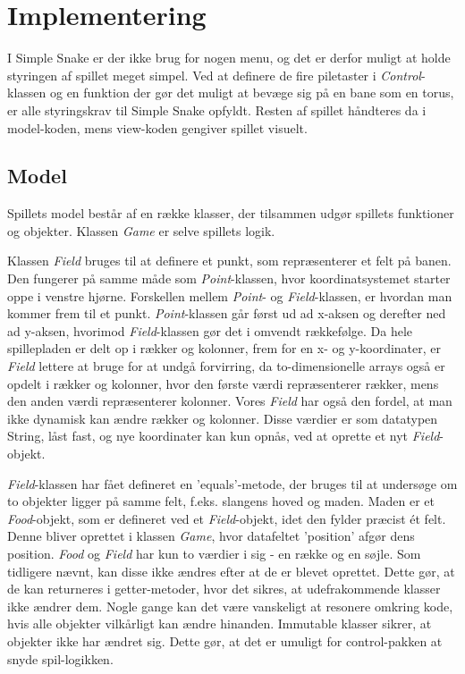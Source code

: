 \section{Implementering}
I Simple Snake er der ikke brug for nogen menu, og det er derfor muligt at holde styringen af spillet meget simpel. Ved at definere de fire piletaster i \textit{Control}-klassen og en funktion der gør det muligt at bevæge sig på en bane som en torus, er alle styringskrav til Simple Snake opfyldt. Resten af spillet håndteres da i model-koden, mens view-koden gengiver spillet visuelt.
\newline

\subsection{Model}
Spillets model består af en række klasser, der tilsammen udgør spillets funktioner og objekter. Klassen \textit{Game} er selve spillets logik.

Klassen \textit{Field} bruges til at definere et punkt, som repræsenterer et felt på banen. Den fungerer på samme måde som \textit{Point}-klassen, hvor koordinatsystemet starter oppe i venstre hjørne. Forskellen mellem \textit{Point}- og \textit{Field}-klassen, er hvordan man kommer frem til et punkt. \textit{Point}-klassen går først ud ad x-aksen og derefter ned ad y-aksen, hvorimod \textit{Field}-klassen gør det i omvendt rækkefølge. Da hele spillepladen er delt op i rækker og kolonner, frem for en x- og y-koordinater, er \textit{Field} lettere at bruge for at undgå forvirring, da to-dimensionelle arrays også er opdelt i rækker og kolonner, hvor den første værdi repræsenterer rækker, mens den anden værdi repræsenterer kolonner. Vores \textit{Field} har også den fordel, at man ikke dynamisk kan ændre rækker og kolonner. Disse værdier er som datatypen String, låst fast, og nye koordinater kan kun opnås, ved at oprette et nyt \textit{Field}-objekt.
\newline

\textit{Field}-klassen har fået defineret en 'equals'-metode, der bruges til at undersøge om to objekter ligger på samme felt, f.eks. slangens hoved og maden. Maden er et \textit{Food}-objekt, som er defineret ved et \textit{Field}-objekt, idet den fylder præcist ét felt. Denne bliver oprettet i klassen \textit{Game}, hvor datafeltet 'position' afgør dens position.
\textit{Food} og \textit{Field} har kun to værdier i sig - en række og en søjle. Som tidligere nævnt, kan disse ikke ændres efter at de er blevet oprettet. Dette gør, at de kan returneres i getter-metoder, hvor det sikres, at udefrakommende klasser ikke ændrer dem. Nogle gange kan det være vanskeligt at resonere omkring kode, hvis alle objekter vilkårligt kan ændre hinanden. Immutable klasser sikrer, at objekter ikke har ændret sig. Dette gør, at det er umuligt for control-pakken at snyde spil-logikken.
\newline

